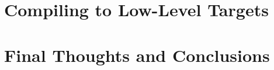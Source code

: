 \chapter{Compiling to Low-Level Targets}
\label{chap:low_level_targets}




\chapter{Final Thoughts and Conclusions}
\label{chap:final_thoughts}

%

\listoffigures
\listoftables
{}
\nocite{*}
\printbibliography[heading=bibintoc]

